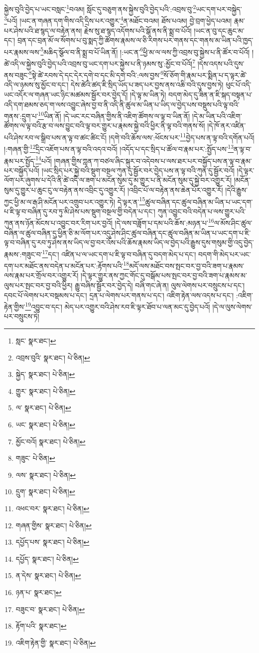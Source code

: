 སྐྱེས་བུའི་བྱེད་པ་ཡང་བསླང་\footnote{སླང་  སྣར་ཐང་། }བའམ། སློང་དུ་བཅུག་ནས་སྐྱེས་བུའི་བྱེད་པའི་:འབྲས་བུ་\footnote{འབྲས་བུའི་  སྣར་ཐང་།  པེ་ཅིན། }ཡང་དག་པར་བསྐྱེད་\footnote{སྐྱེད་  སྣར་ཐང་།  པེ་ཅིན། }པའོ། །ཡང་ན་གཞན་དག་གིས་འདི་དྲིས་པར་འགྱུར་\footnote{གྱུར་  སྣར་ཐང་།  པེ་ཅིན། }ན་མཐོང་བའམ། ཐོས་པའམ། བྱེ་བྲག་ཕྱེད་པའམ། རྣམ་པར་ཤེས་པའི་ཐ་སྙད་ལ་བརྟེན་ནས། རྗེས་སུ་ཐ་སྙད་འདོགས་པའི་སྒོ་ནས་ནི་སྨྲ་བ་པོའོ། །ཡང་ན་བུ་དང་ཆུང་མ་དང་། བྲན་དང་བྲན་མོ་ལ་སོགས་པ་བུ་སྨད་ཀྱི་ཚོགས་རྣམས་ལ་ཅི་རིགས་པར་གནས་དང་གནས་མ་ཡིན་པའི་ཁྱད་པར་རྣམས་ལས་\footnote{ལ་  སྣར་ཐང་།  པེ་ཅིན། }མཆིད་སྩོལ་བ་ནི་སྨྲ་བ་པོ་ཡིན་ནོ། །:ཡང་ན་\footnote{ཡང་  སྣར་ཐང་།  པེ་ཅིན། }ཕྱི་མ་ལ་ལས་ཀྱི་འབྲས་བུ་སྐྱེས་པ་ནི་ཚོར་བ་པོའོ། །ཚེ་འདི་ལ་སྐྱེས་བུའི་བྱེད་པའི་འབྲས་བུ་ཡང་དག་པར་སྐྱེས་པ་ནི་ཉམས་སུ་:མྱོང་བ་པོའོ།\footnote{མྱོང་བའོ།  སྣར་ཐང་།  པེ་ཅིན། } །དེས་འདས་པའི་དུས་ནས་བཟུང་\footnote{གཟུང་  པེ་ཅིན། }སྟེ་ཚེ་རབས་དེ་དང་དེར་དགེ་བ་དང་མི་དགེ་བའི་:ལས་བྱས་\footnote{ལས་  སྣར་ཐང་།  པེ་ཅིན། }སོ་ཅོག་གི་རྣམ་པར་སྨིན་པ་ད་ལྟར་ཚེ་འདི་ལ་ཉམས་སུ་མྱོང་བ་དང་། དེས་ཚེའི་ཚད་ཇི་སྲིད་ཡོད་པ་ཟད་པར་བྱས་ནས་འཆི་བའི་དུས་བྱས་ཏེ། ཕུང་པོ་འདི་ཡང་འདོར་ལ་གཞན་ཡང་ཉིང་མཚམས་སྦྱོར་བར་བྱེད་དོ། །དེ་ལྟ་མ་ཡིན་ཏེ། བདག་མེད་དུ་ཟིན་ན་ཇི་སྐད་བསྟན་པ་འདི་དག་ཐམས་ཅད་ག་ལས་འབྱུང་ཞེས་བྱ་བ་ནི་འདི་ནི་ཚུལ་མ་ཡིན་པ་ཡིད་ལ་བྱེད་པས་བསྡུས་པའི་ལྟ་བའི་གནས་:དྲུག་པ་\footnote{དྲུག་  སྣར་ཐང་།  པེ་ཅིན། }ཡིན་ནོ། །དེ་ཡང་རང་བཞིན་གྱིས་ནི་འཇིག་ཚོགས་ལ་ལྟ་བ་ཡིན་ནོ། །དེ་མ་ཡིན་པའི་འཇིག་ཚོགས་ལ་ལྟ་བའི་རྩ་བ་ལས་བྱུང་བའི་ལྟ་བར་གྱུར་པ་རྣམས་སྐྱེ་བའི་ཕྱིར་ནི་ལྟ་བའི་གནས་སོ། །དེ་ཁོ་ནར་འཛིན་པའི་ཤེས་རབ་ལ་སྒྲིབ་པས་ན་ལྟ་བ་ཚང་ཚིང་ངོ། །དགེ་བའི་ཆོས་ལས་:ཕོངས་པར་\footnote{འཕང་བར་  སྣར་ཐང་།  པེ་ཅིན། }བྱེད་པས་ན་ལྟ་བའི་དགོན་པའོ། །:གཞན་གྱི་\footnote{གཞན་གྱིས་  སྣར་ཐང་།  པེ་ཅིན། }དྲིང་འཇོག་པས་ན་ལྟ་བའི་འདའ་བའོ། །འདོད་པ་དང་སྲིད་པ་ཚོལ་བ་རྣམ་པར་:སྤྱོད་པས་\footnote{དཔྱོད་པས་  སྣར་ཐང་།  པེ་ཅིན། }ན་ལྟ་བ་རྣམ་པར་སྤྱོད་\footnote{དཔྱོད་  སྣར་ཐང་།  པེ་ཅིན། }པའོ། །གཞན་གྱིས་ཀླན་ཀ་བཙལ་ཞིང་སྐུར་བ་འདེབས་པ་ལས་ཐར་པར་བསྐྱོད་པས་ན་ལྟ་བ་རྣམ་པར་བསྐྱོད་པའོ། །ཡང་སྲིད་པར་སྐྱེ་བའི་སྡུག་བསྔལ་ཀུན་དུ་སྦྱོར་བར་བྱེད་པས་ན་ལྟ་བའི་ཀུན་དུ་སྦྱོར་བའོ། །དེ་ལྟར་ལོག་པར་ཞུགས་པ་དེའི་ནི་ཚེ་འདི་ལ་ཟག་པ་མངོན་སུམ་དུ་མ་གྱུར་པ་ནི་མངོན་སུམ་དུ་སྐྱེ་བར་འགྱུར་རོ། །མངོན་སུམ་དུ་གྱུར་པ་ཆུང་ངུ་ལ་བརྟེན་ནས་འབྲིང་དུ་འགྱུར་རོ། །འབྲིང་པོ་ལ་བརྟེན་ནས་ཆེན་པོར་འགྱུར་རོ། །དེའི་རྒྱུས་ཀྱང་ཕྱི་མ་ལ་རྒ་ཤི་མངོན་པར་འགྲུབ་པར་འགྱུར་ཏེ། དེ་ལྟར་ན་\footnote{ན་དེས་  སྣར་ཐང་།  པེ་ཅིན། }ཚུལ་བཞིན་དང་ཚུལ་བཞིན་མ་ཡིན་པ་ཡང་དག་པ་ཇི་ལྟ་བ་བཞིན་དུ་རབ་ཏུ་མི་ཤེས་པས་སྡུག་བསྔལ་གྱི་བདེན་པ་དང་། ཀུན་འབྱུང་བའི་བདེན་པ་ལས་གྱུར་པའི་ཀུན་ནས་ཉོན་མོངས་པ་འབྱུང་བར་རིག་པར་བྱའོ། །དེ་ལས་བཟློག་པ་དམ་པའི་ཆོས་:མཉན་པ་\footnote{ཉན་པ་  སྣར་ཐང་། }ལ་མོས་ཤིང་ཚུལ་བཞིན་ལ་ཚུལ་བཞིན་དུ་ཕྱིན་ཅི་མ་ལོག་པར་འདུ་ཤེས་ཤིང་ཚུལ་བཞིན་དང་ཚུལ་བཞིན་མ་ཡིན་པ་ཡང་དག་པ་ཇི་ལྟ་བ་བཞིན་དུ་རབ་ཏུ་ཤེས་ནས་ཡིད་ལ་བྱ་བར་འོས་པའི་ཆོས་རྣམས་ཡིད་ལ་བྱེད་པའི་རྒྱུས་དུས་གསུམ་གྱི་འདུ་བྱེད་རྣམས་:གཟུང་བ་\footnote{བཟུང་བ་  སྣར་ཐང་།  པེ་ཅིན། }དང་། འཛིན་པ་ལ་ཡང་དག་པ་ཇི་ལྟ་བ་བཞིན་དུ་བདག་མེད་པ་དང་། བདག་གི་མེད་པར་ཡང་དག་པར་མཐོང་ནས་བདེན་པ་མངོན་པར་:རྟོགས་པའི་\footnote{རྟོག་པའི་  སྣར་ཐང་། }མདོ་ལས་མཐོང་བས་སྤང་བར་བྱ་བའི་ཟག་པ་རྣམས་ལས་རྣམ་པར་གྲོལ་བར་འགྱུར་རོ། །དེ་ལྟར་གྱུར་ནས་ཀྱང་གོང་དུ་བསྒོམ་པས་སྤང་བར་བྱ་བའི་ཟག་པ་རྣམས་མ་ལུས་པར་སྤང་བར་བྱ་བའི་ཕྱིར། རྒྱུ་བཞིས་སྦྱོར་བར་བྱེད་དེ། བཞི་གང་ཞེ་ན། ལུས་ལེགས་པར་བསྲུངས་པ་དང་། དབང་པོ་ལེགས་པར་བསྡམས་པ་དང་། དྲན་པ་ལེགས་པར་གནས་པ་དང་། འཇིག་རྟེན་ལས་འདས་པ་དང་། :འཇིག་རྟེན་གྱིས་\footnote{འཇིག་རྟེན་གྱི་  སྣར་ཐང་།  པེ་ཅིན། }འབྱུང་བ་དང་། མེད་པར་འགྱུར་བའི་ཤེས་རབ་ཇི་ལྟར་ཐོབ་པ་ལན་མང་དུ་བྱེད་པའོ། །དེ་ལ་ལུས་ལེགས་པར་བསྲུངས་ཏེ། 
